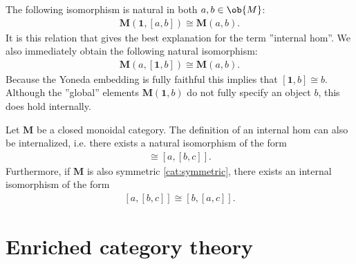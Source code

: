     \begin{property}\label{cat:internal_hom_property}
        The following isomorphism is natural in both $a,b\in\ob{M}$:
        \begin{gather}
            \mathbf{M}(\mathbf{1}, [a,b])\cong\mathbf{M}(a, b).
        \end{gather}
        It is this relation that gives the best explanation for the term ''internal hom''. We also immediately obtain the following natural isomorphism:
        \begin{gather}
            \mathbf{M}(a, [\mathbf{1},b])\cong\mathbf{M}(a, b).
        \end{gather}
        Because the Yoneda embedding is fully faithful this implies that $[\mathbf{1},b]\cong b$. Although the ''global'' elements $\mathbf{M}(\mathbf{1}, b)$ do not fully specify an object $b$, this does hold internally.
    \end{property}

    \begin{property}[Symmetry]
        Let $\mathbf{M}$ be a closed monoidal category. The definition of an internal hom can also be internalized, i.e. there exists a natural isomorphism of the form
        \begin{gather}
            [a\otimes b,c]\cong[a,[b,c]].
        \end{gather}
        Furthermore, if $\mathbf{M}$ is also symmetric \ref{cat:symmetric}, there exists an internal isomorphism of the form
        \begin{gather}
            \label{cat:internal_symmetry}
            [a,[b,c]]\cong[b,[a,c]].
        \end{gather}
    \end{property}


\section{Enriched category theory}\label{section:enriched_category_theory}

